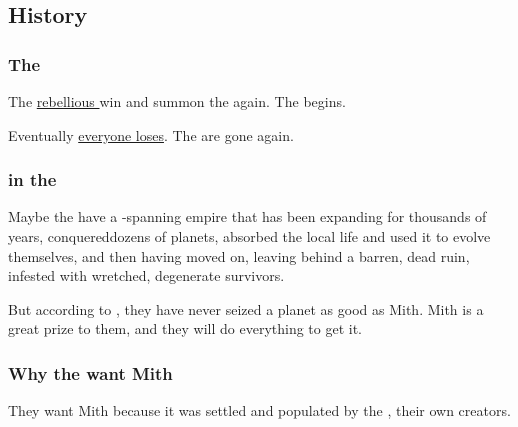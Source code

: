 \subsection{History}
\subsubsection{The \secondbanewar}
The \hyperref[Resphan rebellion]{rebellious \resphain} win and summon the \banes{} again. The \hyperref[Second Banewar]\secondbanewar{} begins. 

Eventually \hyperref[End of the Second Banewar]{everyone loses}. The \banelords{} are gone again. 









\subsubsection{\Banes{} in the \cosmos}
Maybe the \banes{} have a \cosmos-spanning empire that has been expanding for thousands of years, conquereddozens of planets, absorbed the local life and used it to evolve themselves, and then having moved on, leaving behind a barren, dead ruin, infested with wretched, degenerate survivors. 

But according to \Daggerrain, they have never seized a planet as good as Mith. Mith is a great prize to them, and they will do everything to get it.





\subsubsection{Why the \banes{} want Mith}
\label{why the \banes{} want Mith}
They want Mith because it was settled and populated by the \voyagers, their own creators. 






